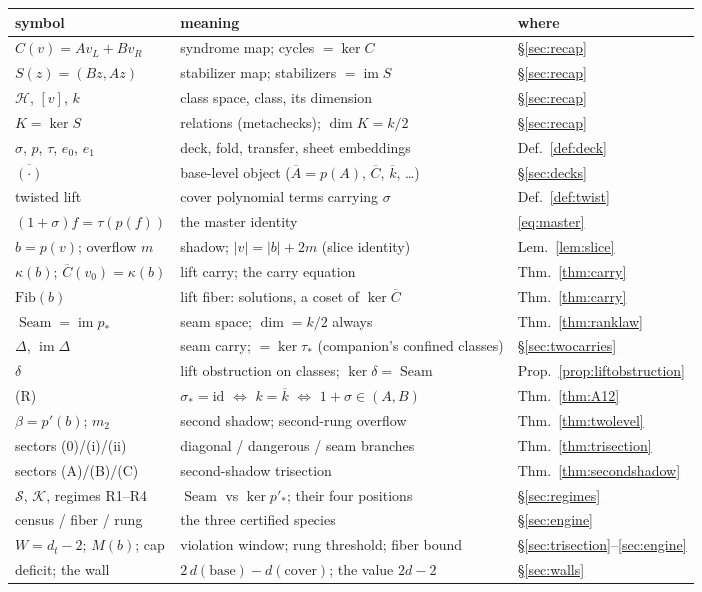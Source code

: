 \documentclass[11pt]{article}
\theoremstyle{plain}
\theoremstyle{definition}
\theoremstyle{remark}
\newcommand{\imD}{\operatorname{im}\Delta}
\newcommand{\Seam}{\operatorname{Seam}}
\newcommand{\clH}{\mathcal{H}}
\newcommand{\base}{\mathrm{base}}
\newcommand{\cov}{\mathrm{cover}}
\newcommand{\wt}[1]{\lvert #1\rvert}
\newcommand{\ov}[1]{\overline{#1}}
\begin{document}
\begin{center}
\small
\begin{tabular}{lll}
\toprule
symbol & meaning & where\\
\midrule
$C(v) = Av_L + Bv_R$ & syndrome map; cycles $= \ker C$ &
\S\ref{sec:recap}\\
$S(z) = (Bz, Az)$ & stabilizer map; stabilizers $= \operatorname{im} S$ &
\S\ref{sec:recap}\\
$\clH$, $[v]$, $k$ & class space, class, its dimension &
\S\ref{sec:recap}\\
$K = \ker S$ & relations (metachecks); $\dim K = k/2$ &
\S\ref{sec:recap}\\
$\sigma$, $p$, $\tau$, $e_0$, $e_1$ & deck, fold, transfer, sheet
embeddings & Def.~\ref{def:deck}\\
$\ov{(\cdot)}$ & base-level object ($\ov A = p(A)$, $\ov C$, $\ov k$,
\dots) & \S\ref{sec:decks}\\
twisted lift & cover polynomial terms carrying $\sigma$ &
Def.~\ref{def:twist}\\
$(1+\sigma)f = \tau(p(f))$ & the master identity & \eqref{eq:master}\\
$b = p(v)$; overflow $m$ & shadow; $\wt v = \wt b + 2m$ (slice identity)
& Lem.~\ref{lem:slice}\\
$\kappa(b)$; $\ov C(v_0) = \kappa(b)$ & lift carry; the carry equation &
Thm.~\ref{thm:carry}\\
$\mathrm{Fib}(b)$ & lift fiber: solutions, a coset of $\ker \ov C$ &
Thm.~\ref{thm:carry}\\
$\Seam = \operatorname{im} p_*$ & seam space; $\dim = k/2$ always &
Thm.~\ref{thm:ranklaw}\\
$\Delta$, $\imD$ & seam carry; $= \ker\tau_*$ (companion's confined
classes) & \S\ref{sec:twocarries}\\
$\delta$ & lift obstruction on classes; $\ker\delta = \Seam$ &
Prop.~\ref{prop:liftobstruction}\\
(R) & $\sigma_* = \mathrm{id}$ $\iff$ $k = \ov k$ $\iff$ $1{+}\sigma \in
(A,B)$ & Thm.~\ref{thm:A12}\\
$\beta = p'(b)$; $m_2$ & second shadow; second-rung overflow &
Thm.~\ref{thm:twolevel}\\
sectors (0)/(i)/(ii) & diagonal / dangerous / seam branches &
Thm.~\ref{thm:trisection}\\
sectors (A)/(B)/(C) & second-shadow trisection &
Thm.~\ref{thm:secondshadow}\\
$\mathcal{S}$, $\mathcal{K}$, regimes R1--R4 & $\Seam$ vs $\ker p'_*$;
their four positions & \S\ref{sec:regimes}\\
census / fiber / rung & the three certified species &
\S\ref{sec:engine}\\
$W = d_t - 2$; $M(b)$; cap & violation window; rung threshold; fiber
bound & \S\ref{sec:trisection}--\ref{sec:engine}\\
deficit; the wall & $2\,d(\base) - d(\cov)$; the value $2d - 2$ &
\S\ref{sec:walls}\\
\bottomrule
\end{tabular}
\end{center}
\end{document}
